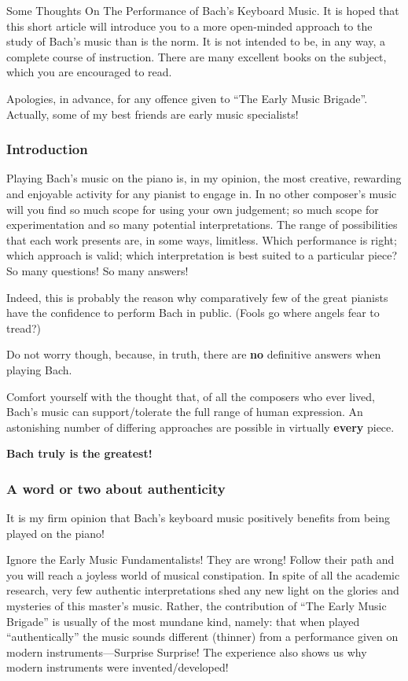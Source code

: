 \documentclass{article}
\begin{document}
Some Thoughts On The Performance of Bach's Keyboard Music.
It is hoped that this short article will introduce you to a more open-minded approach to the study of Bach's music than is the norm.
It is not intended to be, in any way, a complete course of instruction.
There are many excellent books on the subject, which you are encouraged to read.

Apologies, in advance, for any offence given to ``The Early Music Brigade''.
Actually, some of my best friends are early music specialists!

\subsubsection{Introduction}

Playing Bach's music on the piano is, in my opinion, the most creative, rewarding and enjoyable activity for any pianist to engage in.
In no other composer's music will you find so much scope for using your own judgement; so much scope for experimentation and so many potential interpretations.
The range of possibilities that each work presents are, in some ways, limitless.
Which performance is right; which approach is valid; which interpretation is best suited to a particular piece?
So many questions!
So many answers!

Indeed, this is probably the reason why comparatively few of the great pianists have the confidence to perform Bach in public.
(Fools go where angels fear to tread?)

Do not worry though, because, in truth, there are \textbf{no} definitive answers when playing Bach.

Comfort yourself with the thought that, of all the composers who ever lived, Bach's music can support/tolerate the full range of human expression.
An astonishing number of differing approaches are possible in virtually \textbf{every} piece.

\textbf{Bach truly is the greatest!}

\subsubsection{A word or two about authenticity}

It is my firm opinion that Bach's keyboard music positively benefits from being played on the piano!

Ignore the Early Music Fundamentalists!
They are wrong!
Follow their path and you will reach a joyless world of musical constipation.
In spite of all the academic research, very few authentic interpretations shed any new light on the glories and mysteries of this master's music.
Rather, the contribution of ``The Early Music Brigade'' is usually of the most mundane kind, namely: that when played ``authentically'' the music sounds different (thinner) from a performance given on modern instruments---Surprise Surprise!
The experience also shows us why  modern instruments were invented/developed!
\end{document}

